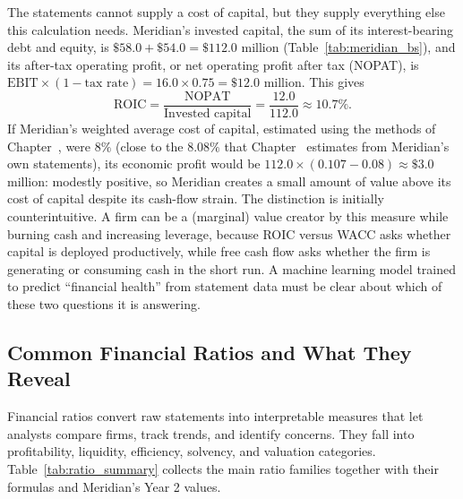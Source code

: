 \documentclass[../ai_in_finance]{subfiles}
\begin{document}
The statements cannot supply a cost of capital, but they supply everything else this calculation needs. Meridian's invested capital, the sum of its interest-bearing debt and equity, is $\$58.0 + \$54.0 = \$112.0$ million (Table~\ref{tab:meridian_bs}), and its after-tax operating profit, or net operating profit after tax (NOPAT), is $\text{EBIT} \times (1 - \text{tax rate}) = 16.0 \times 0.75 = \$12.0$ million. This gives
\begin{equation*}
\text{ROIC} = \frac{\text{NOPAT}}{\text{Invested capital}} = \frac{12.0}{112.0} \approx 10.7\%.
\end{equation*}
If Meridian's weighted average cost of capital, estimated using the methods of Chapter~, were $8\%$ (close to the $8.08\%$ that Chapter~ estimates from Meridian's own statements), its economic profit would be $112.0 \times (0.107 - 0.08) \approx \$3.0$ million: modestly positive, so Meridian creates a small amount of value above its cost of capital despite its cash-flow strain. The distinction is initially counterintuitive. A firm can be a (marginal) value creator by this measure while burning cash and increasing leverage, because ROIC versus WACC asks whether capital is deployed productively, while free cash flow asks whether the firm is generating or consuming cash in the short run. A machine learning model trained to predict ``financial health'' from statement data must be clear about which of these two questions it is answering.

\subsection{Common Financial Ratios and What They Reveal}
\label{sec:ratios}

Financial ratios convert raw statements into interpretable measures that let analysts compare firms, track trends, and identify concerns. They fall into profitability, liquidity, efficiency, solvency, and valuation categories. Table~\ref{tab:ratio_summary} collects the main ratio families together with their formulas and Meridian's Year 2 values.
\end{document}

